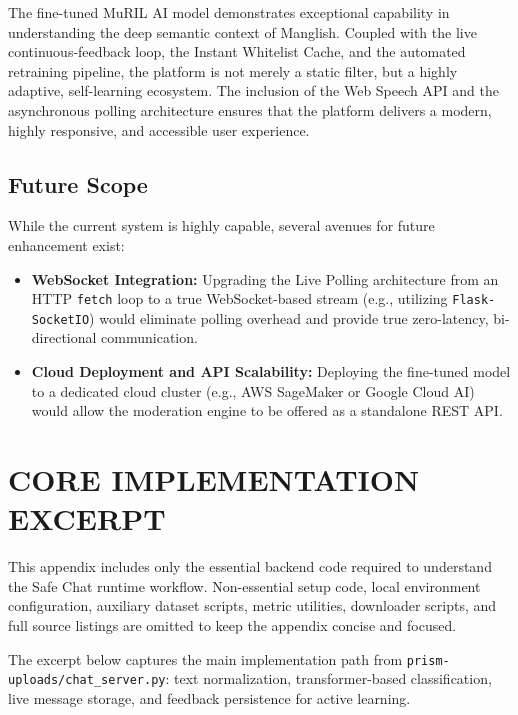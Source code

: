 \documentclass[12pt,a4paper]{report}
\begin{document}
The fine-tuned MuRIL AI model demonstrates exceptional capability in understanding the deep semantic context of Manglish. Coupled with the live continuous-feedback loop, the Instant Whitelist Cache, and the automated retraining pipeline, the platform is not merely a static filter, but a highly adaptive, self-learning ecosystem. The inclusion of the Web Speech API and the asynchronous polling architecture ensures that the platform delivers a modern, highly responsive, and accessible user experience.

\section{Future Scope}
While the current system is highly capable, several avenues for future enhancement exist:
\begin{itemize}
    \item \textbf{WebSocket Integration:} Upgrading the Live Polling architecture from an HTTP \texttt{fetch} loop to a true WebSocket-based stream (e.g., utilizing \texttt{Flask-SocketIO}) would eliminate polling overhead and provide true zero-latency, bi-directional communication.
    \item \textbf{Cloud Deployment and API Scalability:} Deploying the fine-tuned model to a dedicated cloud cluster (e.g., AWS SageMaker or Google Cloud AI) would allow the moderation engine to be offered as a standalone REST API.
\end{itemize}

\clearpage

\appendix
\chapter{CORE IMPLEMENTATION EXCERPT}

This appendix includes only the essential backend code required to understand the Safe Chat runtime workflow. Non-essential setup code, local environment configuration, auxiliary dataset scripts, metric utilities, downloader scripts, and full source listings are omitted to keep the appendix concise and focused.

The excerpt below captures the main implementation path from \texttt{prism-uploads/chat\_server.py}: text normalization, transformer-based classification, live message storage, and feedback persistence for active learning.
\end{document}
